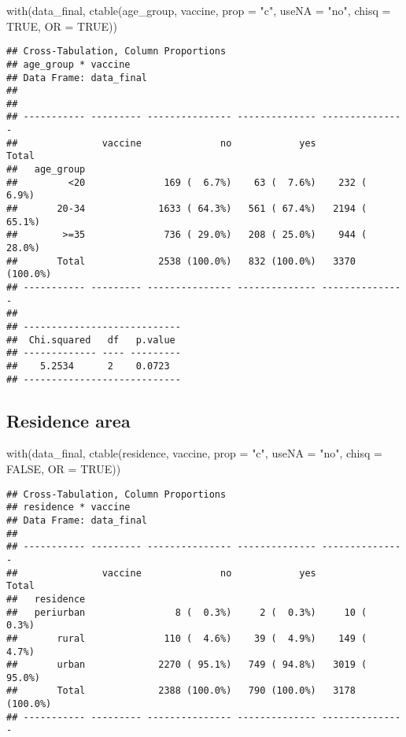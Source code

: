 \documentclass[
]{article}
\newenvironment{Shaded}{\begin{snugshade}}{\end{snugshade}}
\newcommand{\AttributeTok}[1]{\textcolor[rgb]{0.77,0.63,0.00}{#1}}
\newcommand{\ConstantTok}[1]{\textcolor[rgb]{0.00,0.00,0.00}{#1}}
\newcommand{\FunctionTok}[1]{\textcolor[rgb]{0.00,0.00,0.00}{#1}}
\newcommand{\NormalTok}[1]{#1}
\newcommand{\StringTok}[1]{\textcolor[rgb]{0.31,0.60,0.02}{#1}}
\begin{document}
\begin{Shaded}
\begin{Highlighting}[]
\FunctionTok{with}\NormalTok{(data\_final, }\FunctionTok{ctable}\NormalTok{(age\_group, vaccine, }\AttributeTok{prop =} \StringTok{"c"}\NormalTok{, }\AttributeTok{useNA =} \StringTok{"no"}\NormalTok{, }\AttributeTok{chisq =} \ConstantTok{TRUE}\NormalTok{, }\AttributeTok{OR =} \ConstantTok{TRUE}\NormalTok{))}
\end{Highlighting}
\end{Shaded}

\begin{verbatim}
## Cross-Tabulation, Column Proportions  
## age_group * vaccine  
## Data Frame: data_final  
## 
## 
## ----------- --------- --------------- -------------- ---------------
##               vaccine              no            yes           Total
##   age_group                                                         
##         <20              169 (  6.7%)    63 (  7.6%)    232 (  6.9%)
##       20-34             1633 ( 64.3%)   561 ( 67.4%)   2194 ( 65.1%)
##        >=35              736 ( 29.0%)   208 ( 25.0%)    944 ( 28.0%)
##       Total             2538 (100.0%)   832 (100.0%)   3370 (100.0%)
## ----------- --------- --------------- -------------- ---------------
## 
## ----------------------------
##  Chi.squared   df   p.value 
## ------------- ---- ---------
##    5.2534      2    0.0723  
## ----------------------------
\end{verbatim}

\hypertarget{residence-area}{%
\subsection{Residence area}\label{residence-area}}

\begin{Shaded}
\begin{Highlighting}[]
\FunctionTok{with}\NormalTok{(data\_final, }\FunctionTok{ctable}\NormalTok{(residence, vaccine, }\AttributeTok{prop =} \StringTok{"c"}\NormalTok{, }\AttributeTok{useNA =} \StringTok{"no"}\NormalTok{, }\AttributeTok{chisq =} \ConstantTok{FALSE}\NormalTok{, }\AttributeTok{OR =} \ConstantTok{TRUE}\NormalTok{))}
\end{Highlighting}
\end{Shaded}

\begin{verbatim}
## Cross-Tabulation, Column Proportions  
## residence * vaccine  
## Data Frame: data_final  
## 
## ----------- --------- --------------- -------------- ---------------
##               vaccine              no            yes           Total
##   residence                                                         
##   periurban                8 (  0.3%)     2 (  0.3%)     10 (  0.3%)
##       rural              110 (  4.6%)    39 (  4.9%)    149 (  4.7%)
##       urban             2270 ( 95.1%)   749 ( 94.8%)   3019 ( 95.0%)
##       Total             2388 (100.0%)   790 (100.0%)   3178 (100.0%)
## ----------- --------- --------------- -------------- ---------------
\end{verbatim}
\end{document}
